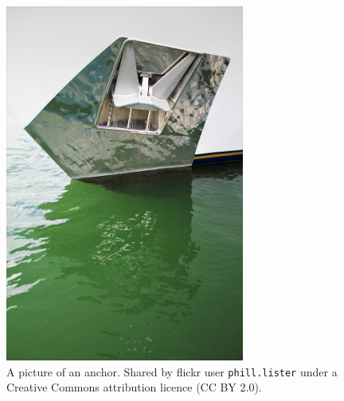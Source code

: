 \documentclass[12pt,xetex]{scrbook}
\begin{document}
\begin{onehalfspace}
\begin{figure}
  \centering
  \includegraphics[width=0.7\textwidth]{anchor}
  \caption{A picture of an anchor.  Shared by flickr user
    \texttt{phill.lister} under a Creative Commons attribution licence
     (CC BY 2.0).}
  \label{fig:anchor}
\end{figure}


\end{onehalfspace}
\end{document}
